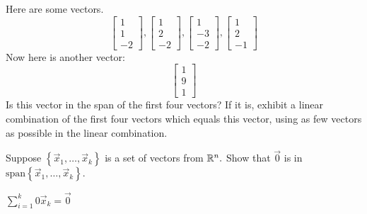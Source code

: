 \documentclass{ximera}
\begin{document}
\begin{problem}\label{prb:3.10} Here are some vectors.
\begin{equation*}
\left[
\begin{array}{r}
1 \\
1 \\
-2
\end{array}
\right] ,\left[
\begin{array}{r}
1 \\
2 \\
-2
\end{array}
\right] ,\left[
\begin{array}{r}
1 \\
-3 \\
-2
\end{array}
\right] ,\left[
\begin{array}{r}
1 \\
2 \\
-1
\end{array}
\right]
\end{equation*}
Now here is another vector:\
\begin{equation*}
\left[
\begin{array}{r}
1 \\
9 \\
1
\end{array}
\right]
\end{equation*}
Is this vector in the span of the first four vectors? If it is, exhibit a
linear combination of the first four vectors which equals this vector, using
as few vectors as possible in the linear combination.
\end{problem}


\begin{problem}\label{prb:3.14} Suppose $\left\{ \vec{x}_{1},\ldots ,\vec{x}_{k}\right\} $ is a
set of vectors from $\mathbb{R}^{n}.$ Show that $\vec{0}$ is in $\mbox{
span}\left\{ \vec{x}_{1},\ldots ,\vec{x}_{k}\right\} .$
\begin{hint}
$\sum_{i=1}^{k}0\vec{x}_{k}=\vec{0}$
\end{hint}
\end{problem}
\end{document}

